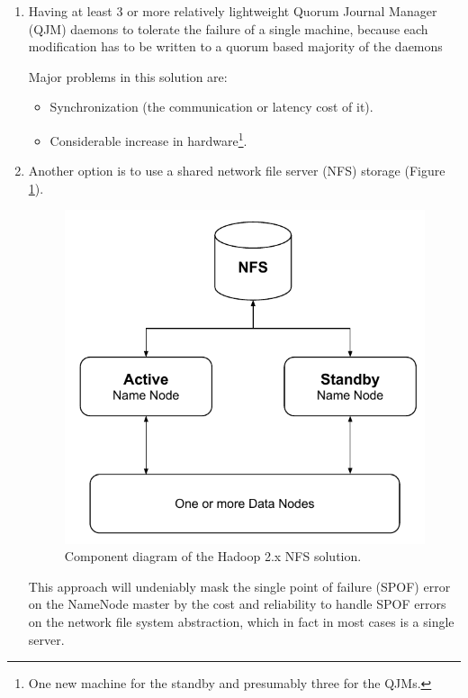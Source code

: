 \begin{enumerate}
	\item Having at least 3 or more relatively lightweight Quorum Journal Manager (QJM) daemons to tolerate the failure of a single machine, because each modification has to be written to a quorum based majority of the daemons
	
	Major problems in this solution are:
\begin{itemize}
	\item Synchronization (the communication or latency cost of it).
	\item Considerable increase in hardware\footnote{One new machine for the standby and presumably three for the QJMs.}.
\end{itemize}
	\vspace*{3mm}
	
	\item Another option is to use a shared network file server (NFS) storage (Figure \ref{fig:hadoop-2x-nfs}).
	\begin{figure}[h!]
		\centering
		\includegraphics[scale=0.6]{pdf/hadoop-2x-nfs.pdf}
		\caption[Hadoop 2.x NFS solution]{Component diagram of the Hadoop 2.x NFS solution. \label{fig:hadoop-2x-nfs}}
	\end{figure}	

	This approach will undeniably mask the single point of failure (SPOF) error on the NameNode master by the cost and reliability to handle SPOF errors on the network file system abstraction, which in fact in most cases is a single server.
\end{enumerate}

